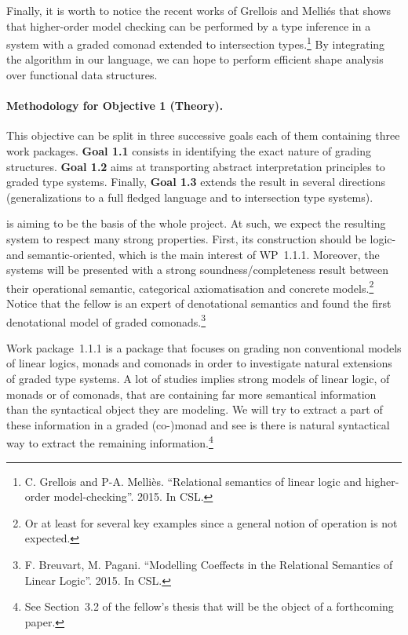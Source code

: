 \documentclass{article}[11pt]
\begin{document}
Finally, it is worth to notice the recent works of Grellois and Melli\'es that shows that higher-order model checking can be performed by a type inference in a system with a graded comonad extended to intersection types.\footnote{C. Grellois and P-A. Melli\`es. ``Relational semantics of linear logic and higher-order model-checking''. 2015. In CSL.} By integrating the algorithm in our language, we can hope to perform efficient shape analysis over functional data structures.




\paragraph{Methodology for Objective 1 (Theory).}

This objective can be split in three successive goals each of them containing three work packages. {\bf Goal 1.1} consists in identifying the exact nature of grading structures. {\bf Goal 1.2} aims at transporting abstract interpretation principles to graded type systems. Finally, {\bf Goal 1.3} extends the result in several directions (generalizations to a full fledged language and to intersection type systems).

 is aiming to be the basis of the whole project. At such, we expect the resulting system to respect many strong properties. First, its construction should be logic- and semantic-oriented, which is the main interest of WP~1.1.1. Moreover, the systems will be presented with a strong soundness/completeness result between their operational semantic, categorical axiomatisation and concrete models.\footnote{Or at least for several key examples since a general notion of operation is not expected.} Notice that the fellow is an expert of denotational semantics and found the first denotational model of graded comonads.\footnote{F. Breuvart, M. Pagani. ``Modelling Coeffects in the Relational Semantics of Linear Logic''. 2015. In CSL.}

 Work package~1.1.1 is a package that focuses on grading non conventional models of linear logics, monads and comonads in order to investigate natural extensions of graded type systems. A lot of studies implies strong models of linear logic, of monads or of comonads, that are containing far more semantical information than the syntactical object they are modeling. We will try to extract a part of these information in a graded (co-)monad and see is there is natural syntactical way to extract the remaining information.\footnote{See Section~3.2 of the fellow's thesis that will be the object of a forthcoming paper.}
\end{document}
